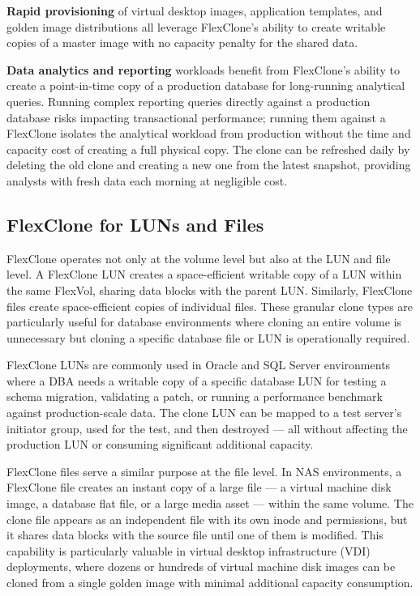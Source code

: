 \textbf{Rapid provisioning} of virtual desktop images, application templates, and golden image distributions all leverage FlexClone's ability to create writable copies of a master image with no capacity penalty for the shared data.

\textbf{Data analytics and reporting} workloads benefit from FlexClone's ability to create a point-in-time copy of a production database for long-running analytical queries. Running complex reporting queries directly against a production database risks impacting transactional performance; running them against a FlexClone isolates the analytical workload from production without the time and capacity cost of creating a full physical copy. The clone can be refreshed daily by deleting the old clone and creating a new one from the latest snapshot, providing analysts with fresh data each morning at negligible cost.

\subsection{FlexClone for LUNs and Files}

FlexClone operates not only at the volume level but also at the LUN and file level. A FlexClone LUN creates a space-efficient writable copy of a LUN within the same FlexVol, sharing data blocks with the parent LUN. Similarly, FlexClone files create space-efficient copies of individual files. These granular clone types are particularly useful for database environments where cloning an entire volume is unnecessary but cloning a specific database file or LUN is operationally required.

FlexClone LUNs are commonly used in Oracle and SQL Server environments where a DBA needs a writable copy of a specific database LUN for testing a schema migration, validating a patch, or running a performance benchmark against production-scale data. The clone LUN can be mapped to a test server's initiator group, used for the test, and then destroyed --- all without affecting the production LUN or consuming significant additional capacity.

FlexClone files serve a similar purpose at the file level. In NAS environments, a FlexClone file creates an instant copy of a large file --- a virtual machine disk image, a database flat file, or a large media asset --- within the same volume. The clone file appears as an independent file with its own inode and permissions, but it shares data blocks with the source file until one of them is modified. This capability is particularly valuable in virtual desktop infrastructure (VDI) deployments, where dozens or hundreds of virtual machine disk images can be cloned from a single golden image with minimal additional capacity consumption.

